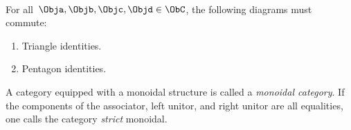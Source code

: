 \begin{ctdefinition}
    \condit\\
    For all~$\Obja,\Objb,\Objc,\Objd\in \ObC$, the following diagrams must commute:
    \begin{enumerate}
        \item Triangle identities.
              \begin{center}
              \end{center}
        \item Pentagon identities.\\
    \end{enumerate}
    \begin{center}
    \end{center}
    A category equipped with a monoidal structure is called a \emph{monoidal category}.
    If the components of the associator, left unitor, and right unitor are all equalities, one calls the category \emph{strict} monoidal.
\end{ctdefinition}

